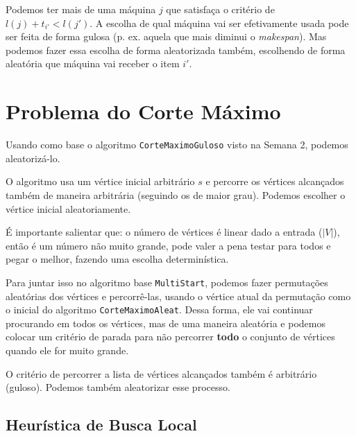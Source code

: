 Podemos ter mais de uma máquina $j$ que satisfaça o critério de $l(j) + t_{i'} < l(j')$. A escolha de qual máquina vai ser efetivamente usada pode ser feita de forma gulosa (p. ex. aquela que mais diminui o \textit{makespan}). Mas podemos fazer essa escolha de forma aleatorizada também, escolhendo de forma aleatória que máquina vai receber o item $i'$.

\section{Problema do Corte Máximo}

Usando como base o algoritmo \lstinline{CorteMaximoGuloso} visto na Semana 2, podemos aleatorizá-lo.

\begin{algorithm}
	\SetAlgoLined

\end{algorithm}

O algoritmo usa um vértice inicial arbitrário $s$ e percorre os vértices alcançados também de maneira arbitrária (seguindo os de maior grau). Podemos escolher o vértice inicial aleatoriamente.

É importante salientar que: o número de vértices é linear dado a entrada ($|V|$), então é um número não muito grande, pode valer a pena testar para todos e pegar o melhor, fazendo uma escolha determinística.

Para juntar isso no algoritmo base \lstinline{MultiStart}, podemos fazer permutações aleatórias dos vértices e percorrê-las, usando o vértice atual da permutação como o inicial do algoritmo \lstinline{CorteMaximoAleat}. Dessa forma, ele vai continuar procurando em todos os vértices, mas de uma maneira aleatória e podemos colocar um critério de parada para não percorrer \textbf{todo} o conjunto de vértices quando ele for muito grande.

O critério de percorrer a lista de vértices alcançados também é arbitrário (guloso). Podemos também aleatorizar esse processo.

\subsection{Heurística de Busca Local}

